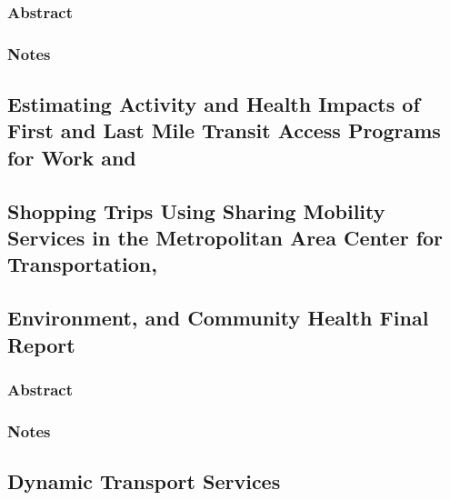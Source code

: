 \documentclass[
]{article}
\begin{document}
\hypertarget{abstract-21}{%
\subsubsection{Abstract}\label{abstract-21}}

\hypertarget{notes-21}{%
\subsubsection{Notes}\label{notes-21}}

\hypertarget{estimating-activity-and-health-impacts-of-first-and-last-mile-transit-access-programs-for-work-and}{%
\subsection{Estimating Activity and Health Impacts of First and Last
Mile Transit Access Programs for Work
and}\label{estimating-activity-and-health-impacts-of-first-and-last-mile-transit-access-programs-for-work-and}}

\hypertarget{shopping-trips-using-sharing-mobility-services-in-the-metropolitan-area-center-for-transportation}{%
\subsection{Shopping Trips Using Sharing Mobility Services in the
Metropolitan Area Center for
Transportation,}\label{shopping-trips-using-sharing-mobility-services-in-the-metropolitan-area-center-for-transportation}}

\hypertarget{environment-and-community-health-final-report}{%
\subsection{Environment, and Community Health Final
Report}\label{environment-and-community-health-final-report}}

\hypertarget{abstract-22}{%
\subsubsection{Abstract}\label{abstract-22}}

\hypertarget{notes-22}{%
\subsubsection{Notes}\label{notes-22}}

\hypertarget{dynamic-transport-services}{%
\subsection{Dynamic Transport
Services}\label{dynamic-transport-services}}
\end{document}
